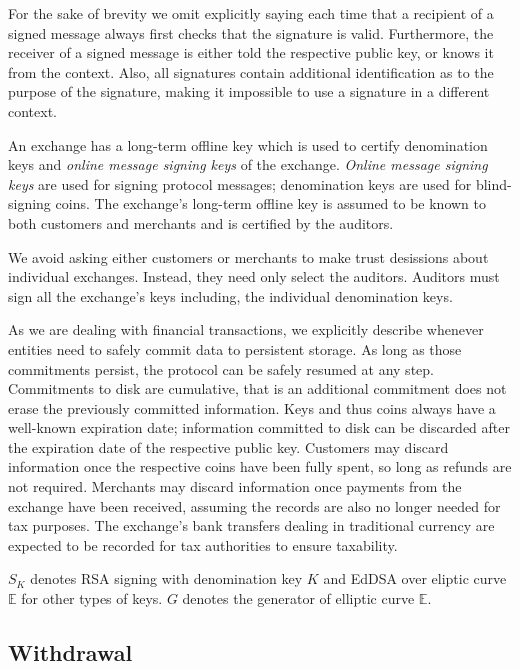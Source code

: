 \documentclass{llncs}
\begin{document}

For the sake of brevity we omit explicitly saying each time that a
recipient of a signed message always first checks that the signature
is valid.  Furthermore, the receiver of a signed message is either
told the respective public key, or knows it from the context.  Also,
all signatures contain additional identification as to the purpose of
the signature, making it impossible to use a signature in a different
context.

An exchange has a long-term offline key which is used to certify
denomination keys and {\em online message signing keys} of the
exchange.  {\em Online message signing keys} are used for signing
protocol messages; denomination keys are used for blind-signing coins.
The exchange's long-term offline key is assumed to be known to both
customers and merchants and is certified by the auditors.

We avoid asking either customers or merchants to make trust desissions
about individual exchanges.  Instead, they need only select the auditors.
Auditors must sign all the exchange's keys including, the individual
denomination keys.

As we are dealing with financial transactions, we explicitly describe
whenever entities need to safely commit data to persistent storage.
As long as those commitments persist, the protocol can be safely
resumed at any step.  Commitments to disk are cumulative, that is an
additional commitment does not erase the previously committed
information.  Keys and thus coins always have a well-known expiration
date; information committed to disk can be discarded after the
expiration date of the respective public key.
Customers may discard information once the respective coins have been
fully spent, so long as refunds are not required.
Merchants may discard information once payments from the exchange have
been received, assuming the records are also no longer needed for tax
purposes.  The exchange's bank transfers dealing in traditional currency
are expected to be recorded for tax authorities to ensure taxability.

$S_K$ denotes RSA signing with denomination key $K$ and EdDSA
over eliptic curve $\mathbb{E}$ for other types of keys.
$G$ denotes the generator of elliptic curve $\mathbb{E}$.

\subsection{Withdrawal}
\end{document}
